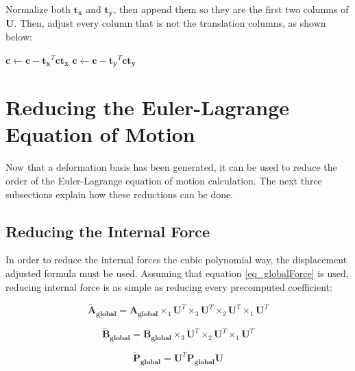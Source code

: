 \documentclass[twocolumn,10pt]{asme2ej}
\begin{document}
Normalize both $\bm{t_x}$ and $\bm{t_y}$, then append them so they are the first two columns of $\bm{U}$. Then, adjust every column that is not the translation columns, as shown below:

\bigskip
\begin{algorithmic}[1]
          \State $ \bm{c} \gets \bm{c} -  \bm{t_x}^T \bm{c} \bm{t_x}$
          \State $ \bm{c} \gets \bm{c} -  \bm{t_y}^T \bm{c} \bm{t_y}$
          \EndIf
        \EndFor
    \EndFunction
\end{algorithmic}

\section{Reducing the Euler-Lagrange Equation of Motion}

Now that a deformation basis has been generated, it can be used to reduce the order of the Euler-Lagrange equation of motion calculation. The next three subsections explain how these reductions can be done.

\subsection{Reducing the Internal Force}

In order to reduce the internal forces the cubic polynomial way, the displacement adjusted formula must be used. Assuming that equation \ref{eq_globalForce} is used, reducing internal force is as simple as reducing every precomputed coefficient:

\begin{equation}
  \bm{\tilde{A}_{global}} = \bm{A_{global}} \times_4 \bm{U}^T  \times_3 \bm{U}^T  \times_2 \bm{U}^T  \times_1 \bm{U}^T
\end{equation}

\begin{equation}
  \bm{\tilde{B}_{global}} = \bm{B_{global}} \times_3 \bm{U}^T  \times_2 \bm{U}^T  \times_1 \bm{U}^T
\end{equation}

\begin{equation}
  \bm{\tilde{P}_{global}} = \bm{U}^T \bm{P_{global}} \bm{U}
\end{equation}
\end{document}
